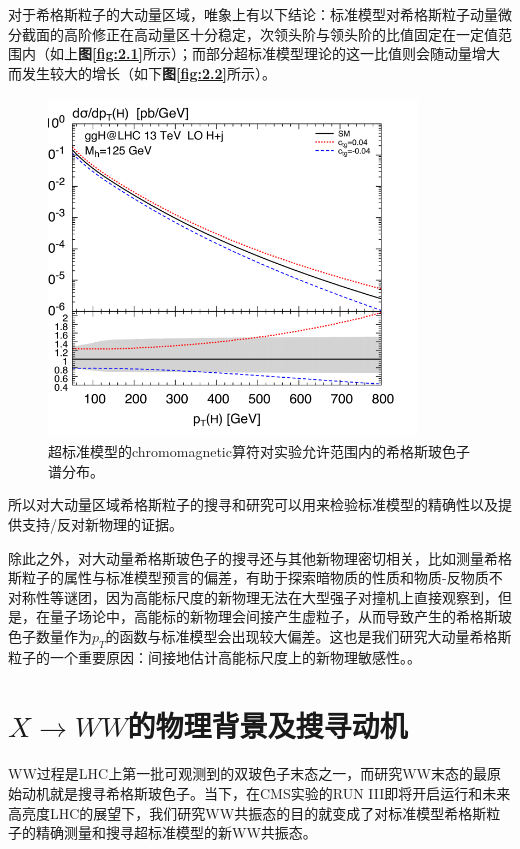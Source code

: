 对于希格斯粒子的大动量区域，唯象上有以下结论\cite{Higgs_high_pt}：标准模型对希格斯粒子动量微分截面的高阶修正在高动量区十分稳定，次领头阶与领头阶的比值固定在一定值范围内（如上\textbf{图\ref{fig:2.1}}所示）；而部分超标准模型理论\cite{Higgs_high_pt_BSM}的这一比值则会随动量增大而发生较大的增长（如下\textbf{图\ref{fig:2.2}}所示）。
\begin{figure}[H]
 \centering
 \includegraphics[height=9cm, width=9.8cm]{pictures/BSM_NLO:LO.png}
  \caption{超标准模型的chromomagnetic算符对实验允许范围内的希格斯玻色子谱分布。\cite{Higgs_high_pt_BSM}}
 \label{fig:2.3}
\end{figure}
所以对大动量区域希格斯粒子的搜寻和研究可以用来检验标准模型的精确性以及提供支持/反对新物理的证据。

除此之外，对大动量希格斯玻色子的搜寻还与其他新物理密切相关，比如测量希格斯粒子的属性与标准模型预言的偏差，有助于探索暗物质的性质和物质-反物质不对称性等谜团，因为高能标尺度的新物理无法在大型强子对撞机上直接观察到，但是，在量子场论中，高能标的新物理会间接产生虚粒子，从而导致产生的希格斯玻色子数量作为$p_T$的函数与标准模型会出现较大偏差。这也是我们研究大动量希格斯粒子的一个重要原因：间接地估计高能标尺度上的新物理敏感性。。

\section{$X\to WW$的物理背景及搜寻动机}
WW过程是LHC上第一批可观测到的双玻色子末态之一，而研究WW末态的最原始动机就是搜寻希格斯玻⾊⼦。当下，在CMS实验的RUN III即将开启运行和未来高亮度LHC的展望下，我们研究WW共振态的目的就变成了对标准模型希格斯粒子的精确测量和搜寻超标准模型的新WW共振态。
